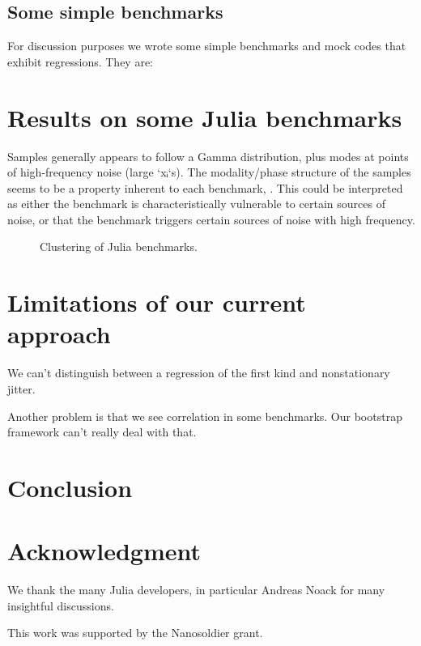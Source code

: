 \documentclass[conference]{IEEEtran}
\begin{document}
\subsection{Some simple benchmarks}

For discussion purposes we wrote some simple benchmarks and mock codes that exhibit regressions. They are:




\section{Results on some Julia benchmarks}

Samples generally appears to follow a Gamma distribution, plus modes at points of high-frequency noise (large `xᵢ`s). The modality/phase structure of the samples seems to be a property inherent to each benchmark, . This could be interpreted as either the benchmark is characteristically vulnerable to certain sources of noise, or that the benchmark triggers certain sources of noise with high frequency.


\begin{figure}[!t]
\centering
{}
\caption{Clustering of Julia benchmarks.}
\label{fig:benchclusters}
\end{figure}


\section{Limitations of our current approach}

We can't distinguish between a regression of the first kind and nonstationary jitter.

Another problem is that we see correlation in some benchmarks. Our bootstrap framework can't really deal with that.


\section{Conclusion}




\section*{Acknowledgment}

We thank the many Julia developers, in particular Andreas Noack for many insightful discussions.

This work was supported by the Nanosoldier grant.




\end{document}
